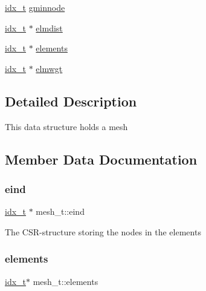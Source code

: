 \begin{DoxyCompactItemize}
\item 
\hyperlink{a00876_aaa5262be3e700770163401acb0150f52}{idx\+\_\+t} \hyperlink{a00738_aae7efc9e003a2c4da4a50040e503c488}{gminnode}
\item 
\hyperlink{a00876_aaa5262be3e700770163401acb0150f52}{idx\+\_\+t} $\ast$ \hyperlink{a00738_aea78593f8f3ecb6e3ca87c9831812db3}{elmdist}
\item 
\hyperlink{a00876_aaa5262be3e700770163401acb0150f52}{idx\+\_\+t} $\ast$ \hyperlink{a00738_aa69fab4095fa702868b0f40eb79d8e00}{elements}
\item 
\hyperlink{a00876_aaa5262be3e700770163401acb0150f52}{idx\+\_\+t} $\ast$ \hyperlink{a00738_ace3783c80f252853712db84524c47c4a}{elmwgt}
\end{DoxyCompactItemize}


\subsection{Detailed Description}
This data structure holds a mesh 

\subsection{Member Data Documentation}
\mbox{\label{a00738_aea23f507e73665abf78ffc3ecc540210}} 
\subsubsection{\texorpdfstring{eind}{eind}}
{\footnotesize\ttfamily \hyperlink{a00876_aaa5262be3e700770163401acb0150f52}{idx\+\_\+t} $\ast$ mesh\+\_\+t\+::eind}

The C\+S\+R-\/structure storing the nodes in the elements \mbox{\label{a00738_aa69fab4095fa702868b0f40eb79d8e00}} 
\subsubsection{\texorpdfstring{elements}{elements}}
{\footnotesize\ttfamily \hyperlink{a00876_aaa5262be3e700770163401acb0150f52}{idx\+\_\+t}$\ast$ mesh\+\_\+t\+::elements}

\mbox{\label{a00738_aea78593f8f3ecb6e3ca87c9831812db3}} 
